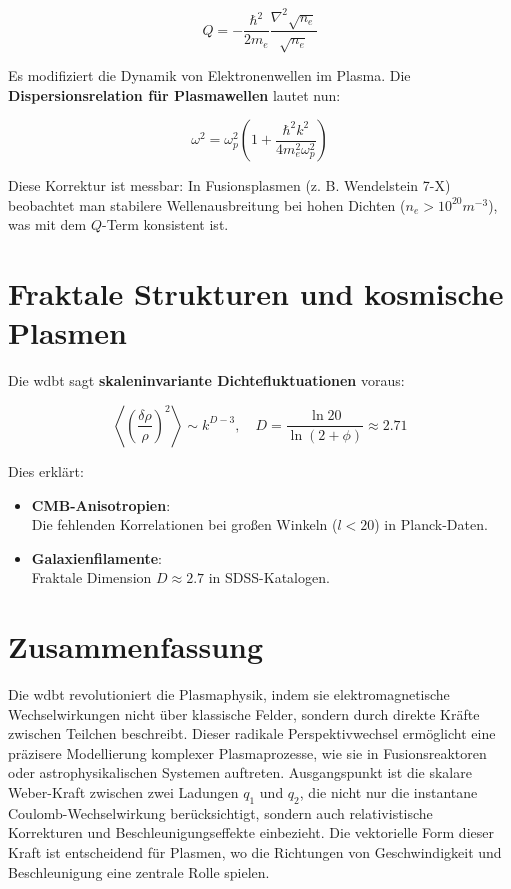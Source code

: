 \begin{equation}
Q = -\frac{\hbar^2}{2m_e} \frac{\nabla^2 \sqrt{n_e}}{\sqrt{n_e}}
\end{equation}

Es modifiziert die Dynamik von Elektronenwellen im Plasma. Die \textbf{Dispersionsrelation für Plasmawellen} lautet nun:

\begin{equation}
\omega^2 = \omega_p^2 \left( 1 + \frac{\hbar^2 k^2}{4 m_e^2 \omega_p^2} \right)
\end{equation}

Diese Korrektur ist messbar: In Fusionsplasmen (z. B. Wendelstein 7-X) beobachtet man stabilere Wellenausbreitung bei hohen Dichten ($n_e > 10^{20} m^{-3}$), was mit dem $Q$-Term
konsistent ist.

\section{Fraktale Strukturen und kosmische Plasmen}
Die \gls{wdbt} sagt \textbf{skaleninvariante Dichtefluktuationen} voraus:

\begin{equation}
\left\langle \left( \frac{\delta \rho}{\rho} \right)^2 \right\rangle \sim k^{D-3}, \quad D = \frac{\ln 20}{\ln(2+\phi)} \approx 2.71
\end{equation}

Dies erklärt:

\begin{itemize}
    \item \textbf{CMB-Anisotropien}:\\Die fehlenden Korrelationen bei großen Winkeln ($l < 20$) in Planck-Daten.
    \item \textbf{Galaxienfilamente}:\\Fraktale Dimension $D \approx 2.7$ in SDSS-Katalogen.
\end{itemize}

\section{Zusammenfassung}
Die \gls{wdbt} revolutioniert die Plasmaphysik, indem sie elektromagnetische Wechselwirkungen nicht über klassische Felder, sondern durch direkte Kräfte zwischen Teilchen beschreibt.
Dieser radikale Perspektivwechsel ermöglicht eine präzisere Modellierung komplexer Plasmaprozesse, wie sie in Fusionsreaktoren oder astrophysikalischen Systemen auftreten.
Ausgangspunkt ist die skalare Weber-Kraft zwischen zwei Ladungen $q_1$ und $q_2$, die nicht nur die instantane Coulomb-Wechselwirkung berücksichtigt, sondern auch relativistische
Korrekturen und Beschleunigungseffekte einbezieht. Die vektorielle Form dieser Kraft ist entscheidend für Plasmen, wo die Richtungen von Geschwindigkeit und Beschleunigung eine
zentrale Rolle spielen.

